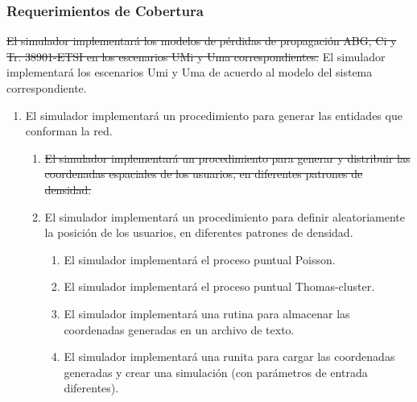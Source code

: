  \subsubsection{Requerimientos de Cobertura}
 \sout{El simulador implementará los modelos de pérdidas de propagación ABG, Ci y Tr. 38901-ETSI en los escenarios UMi y Uma correspondientes.}  
       El simulador implementará los escenarios Umi y Uma de acuerdo al modelo del sistema correspondiente. 
        \begin{enumerate}
            \item El simulador implementará un procedimiento para generar las entidades que conforman la red.
            \begin{enumerate}            
                            \item \sout{El simulador implementará un procedimiento para generar y distribuir las coordenadas espaciales de los usuarios, en diferentes patrones de densidad.}
                            \item El simulador implementará un procedimiento para definir aleatoriamente la posición de los usuarios, en diferentes patrones de densidad.
                                \begin{enumerate}            
                                    \item El simulador implementará el proceso puntual Poisson.
                                    \item El simulador implementará el proceso puntual Thomas-cluster.
                                    \item El simulador implementará una rutina para almacenar las coordenadas generadas en un archivo de texto.
                                    \item El simulador implementará una runita para cargar las coordenadas generadas y crear una simulación (con parámetros de entrada diferentes).
                                \end{enumerate}
                        

\end{enumerate}
\end{enumerate}
